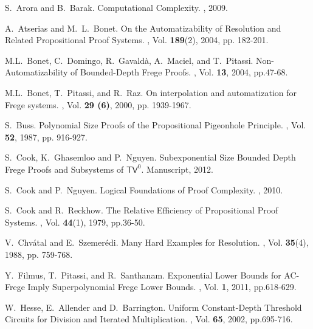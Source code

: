 \documentclass{LMCS}
\begin{document}
\begin{thebibliography}{10}


S.~Arora and B.~Barak.
\newblock Computational Complexity.
, 2009.

A.~Atserias and M.~L.~Bonet.
\newblock On the Automatizability of Resolution and Related Propositional Proof
Systems.
, Vol. {\bf 189}(2), 2004, pp. 182-201.



M.L.~Bonet, C.~Domingo, R.~Gavald\`a, A.~Maciel, and T.~Pitassi.
\newblock Non-Automatizability of Bounded-Depth Frege Proofs.
, Vol. {\bf 13}, 2004, pp.47-68.

M.L.~Bonet, T.~Pitassi, and R.~Raz.
\newblock On interpolation and automatization for Frege systems.
,  Vol. {\bf 29 (6)}, 2000, pp. 1939-1967.


S.~Buss.
\newblock Polynomial Size Proofs of the Propositional Pigeonhole Principle.
, Vol. {\bf 52}, 1987, pp. 916-927.

S.~Cook, K.~Ghasemloo and P.~Nguyen.
\newblock Subexponential Size Bounded Depth Frege Proofs and Subsystems of $\mathsf{TV}^0$.
\newblock Manuscript, 2012.

S.~Cook and P.~Nguyen.
\newblock Logical Foundations of Proof Complexity.
, 2010.


S.~Cook and R.~Reckhow.
\newblock The Relative Efficiency of Propositional Proof Systems.
, Vol. {\bf 44}(1), 1979, pp.36-50.

V.~Chv{\'a}tal and E.~Szemer{\'e}di.
\newblock Many Hard Examples for Resolution.
, Vol. {\bf 35}(4), 1988, pp. 759-768.

Y.~Filmus, T.~Pitassi,  and R.~Santhanam.
\newblock Exponential Lower Bounds for AC-Frege Imply Superpolynomial Frege Lower
Bounds.
, Vol. {\bf 1}, 2011, pp.618-629.

W.~Hesse, E.~Allender and D.~Barrington.
\newblock Uniform Constant-Depth Threshold Circuits for Division and
Iterated Multiplication.
, Vol. {\bf 65}, 2002,
pp.695-716.


\end{thebibliography}
\end{document}
